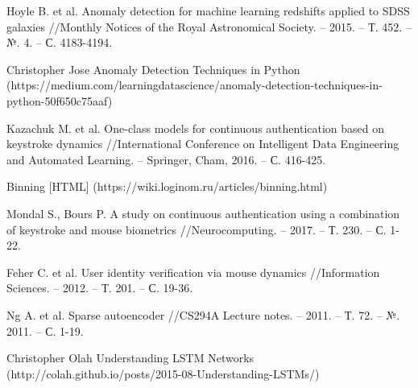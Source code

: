 \documentclass[12pt]{article}
\begin{document}
\begin{thebibliography}{20}
        Hoyle B. et al. Anomaly detection for machine learning redshifts applied to SDSS galaxies //Monthly Notices of the Royal Astronomical Society. – 2015. – Т. 452. – №. 4. – С. 4183-4194.

        Christopher Jose Anomaly Detection Techniques in Python (https://medium.com/learningdatascience/anomaly-detection-techniques-in-python-50f650c75aaf)

        Kazachuk M. et al. One-class models for continuous authentication based on keystroke dynamics //International Conference on Intelligent Data Engineering and Automated Learning. – Springer, Cham, 2016. – С. 416-425.

        Binning [HTML] (https://wiki.loginom.ru/articles/binning.html)

        Mondal S., Bours P. A study on continuous authentication using a combination of keystroke and mouse biometrics //Neurocomputing. – 2017. – Т. 230. – С. 1-22.

        Feher C. et al. User identity verification via mouse dynamics //Information Sciences. – 2012. – Т. 201. – С. 19-36.

        Ng A. et al. Sparse autoencoder //CS294A Lecture notes. – 2011. – Т. 72. – №. 2011. – С. 1-19.

        Christopher Olah Understanding LSTM Networks (http://colah.github.io/posts/2015-08-Understanding-LSTMs/)
        
    \end{thebibliography}
\end{document}
